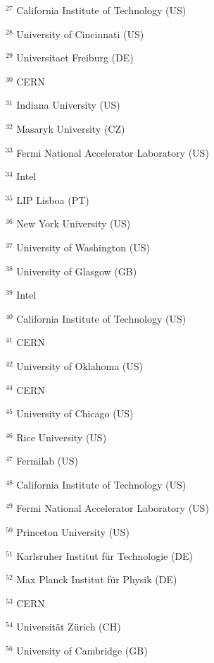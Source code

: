 \par {\footnotesize $^{27}$ California Institute of Technology (US)}
\par {\footnotesize $^{28}$ University of Cincinnati (US)}
\par {\footnotesize $^{29}$ Universitaet Freiburg (DE)}
\par {\footnotesize $^{30}$ CERN}
\par {\footnotesize $^{31}$ Indiana University (US)}
\par {\footnotesize $^{32}$ Masaryk University (CZ)}
\par {\footnotesize $^{33}$ Fermi National Accelerator Laboratory (US)}
\par {\footnotesize $^{34}$ Intel}
\par {\footnotesize $^{35}$ LIP Lisboa (PT)}
\par {\footnotesize $^{36}$ New York University (US)}
\par {\footnotesize $^{37}$ University of Washington (US)}
\par {\footnotesize $^{38}$ University of Glasgow (GB) }
\par {\footnotesize $^{39}$ Intel}
\par {\footnotesize $^{40}$ California Institute of Technology (US)}
\par {\footnotesize $^{41}$ CERN}
\par {\footnotesize $^{42}$ University of Oklahoma (US)}
\par {\footnotesize $^{44}$ CERN}
\par {\footnotesize $^{45}$ University of Chicago (US)}
\par {\footnotesize $^{46}$ Rice University (US)}
\par {\footnotesize $^{47}$ Fermilab (US)}
\par {\footnotesize $^{48}$ California Institute of Technology (US)}
\par {\footnotesize $^{49}$ Fermi National Accelerator Laboratory (US)}
\par {\footnotesize $^{50}$ Princeton University (US)}
\par {\footnotesize $^{51}$ Karlsruher Institut f{\"u}r Technologie (DE)}
\par {\footnotesize $^{52}$ Max Planck Institut f{\"u}r Physik (DE)}
\par {\footnotesize $^{53}$ CERN}
\par {\footnotesize $^{54}$ Universit{\"a}t Z{\"u}rich (CH)}
\par {\footnotesize $^{56}$ University of Cambridge (GB)}
